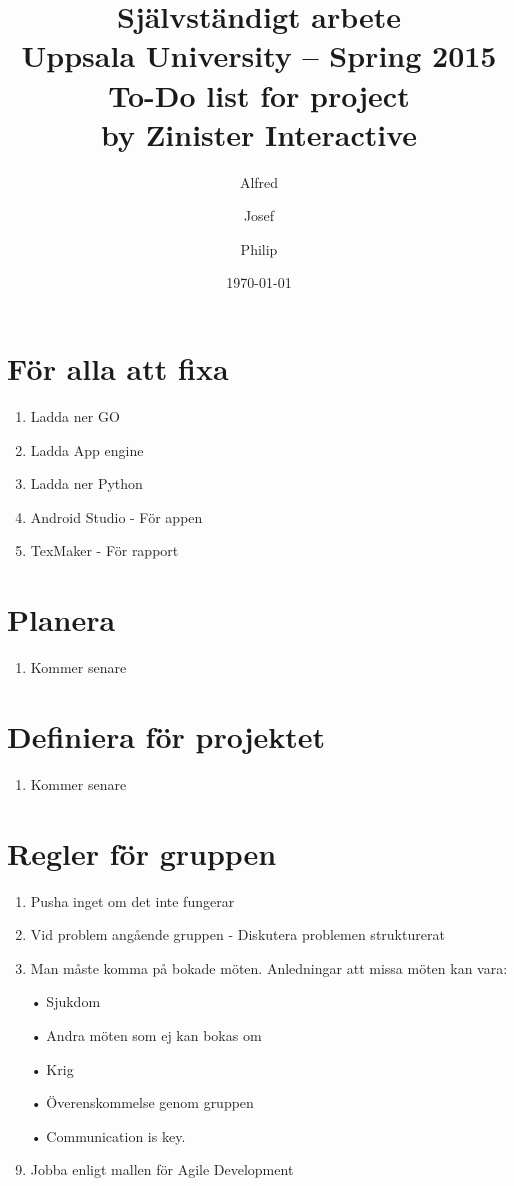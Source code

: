 \documentclass[a4paper,11pt]{article}
\title{\textbf{Självständigt arbete \\
    Uppsala University -- Spring 2015 \\
    To-Do list for project \\
    by Zinister Interactive}}
\author{Alfred \and Josef \and Philip}
\date{\today}
\begin{document}
\maketitle

\pagebreak

\section{För alla att fixa}
\begin{enumerate}
\item Ladda ner GO
\item Ladda App engine
\item Ladda ner Python
\item Android Studio - För appen
\item TexMaker - För rapport
\end{enumerate}

\section{Planera}
\begin{enumerate}
\item Kommer senare
\end{enumerate}

\section{Definiera för projektet}
\begin{enumerate}
\item Kommer senare
\end{enumerate}

\section{Regler för gruppen}
\begin{enumerate}
\item Pusha inget om det inte fungerar
\item Vid problem angående gruppen - Diskutera problemen strukturerat
\item Man måste komma på bokade möten. Anledningar att missa möten kan vara:
\item[•] Sjukdom
\item[•] Andra möten som ej kan bokas om
\item[•] Krig
\item[•] Överenskommelse genom gruppen
\item[•] Communication is key.
\item Jobba enligt mallen för Agile Development

\end{enumerate}
\end{document}
